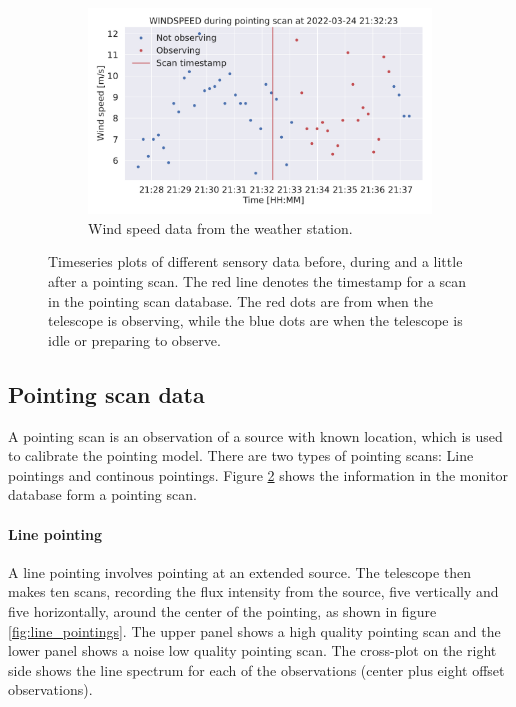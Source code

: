 \begin{figure}[H]
\begin{subfigure}[t]{0.49\textwidth}
        \centering
        \includegraphics[width=\textwidth]{Feature during scans/scan_WINDSPEED_335.pdf}
        \caption{Wind speed data from the weather station.}
        \label{subfig:scan_windspeed}
    \end{subfigure}
     \caption{Timeseries plots of different sensory data before, during and a little after a pointing scan. The red line denotes the timestamp for a scan in the pointing scan database.
     The red dots are from when the telescope is observing, while the blue dots are when the telescope is idle or preparing to observe.}
     \label{fig:features_during_scans}
\end{figure}


\subsection{Pointing scan data}
A pointing scan is an observation of a source with known location, which is used to calibrate the pointing model.
There are two types of pointing scans: Line pointings and continous pointings.
Figure \ref{fig:features_during_scans} shows the information in the monitor database form a pointing scan.
\paragraph{Line pointing}
A line pointing involves pointing at an extended source. 
The telescope then makes ten scans, recording the flux intensity from the source, five vertically and five horizontally, around the center of the pointing, as shown in figure \ref{fig:line_pointings}.
The upper panel shows a high quality pointing scan and the lower panel shows a noise low quality pointing scan.
The cross-plot on the right side shows the line spectrum for each of the observations (center plus eight offset observations).

